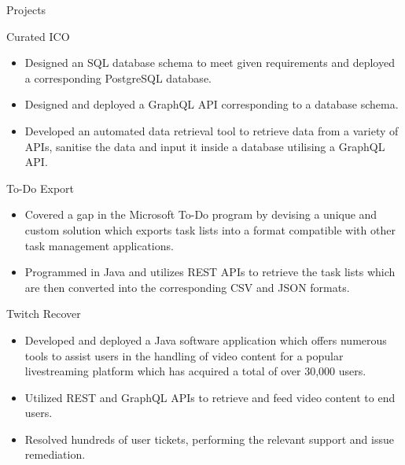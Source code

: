 \documentclass{article}
\newlength{\tabin}
\newlength{\secsep}
\newcommand{\lineunder}{\vspace*{-8pt} \\ \hspace*{-6pt} \hrulefill \\ \vspace*{-15pt}}
\newenvironment{tabbedsection}[1]{
  \begin{list}{}{
      \setlength{\itemsep}{0pt}
      \setlength{\labelsep}{0pt}
      \setlength{\labelwidth}{0pt}
      \setlength{\leftmargin}{\tabin}
      \setlength{\rightmargin}{\tabin}
      \setlength{\listparindent}{0pt}
      \setlength{\parsep}{0pt}
      \setlength{\parskip}{0pt}
      \setlength{\partopsep}{0pt}
      \setlength{\topsep}{#1}
    }
  \item[]
}{\end{list}}
\newenvironment{resume_section}[1]{
  \filbreak
  \vspace{2\secsep}
  \textsc{\large#1}
  \lineunder
  \begin{tabbedsection}{\secsep}
}{\end{tabbedsection}}
\newenvironment{resume_subsection}[2][]{
  \textbf{#2} \hfill {\normalsize #1} \hspace{-5em}
  \begin{tabbedsection}{0.5\secsep}
}{\end{tabbedsection}}
\newenvironment{subitems}{
  \renewcommand{\labelitemi}{-}
  \begin{itemize}
      \setlength{\labelsep}{1em}
}{\end{itemize}}
\begin{document}
\begin{resume_section}{Projects}
	\begin{resume_subsection}{Curated ICO}
		\begin{subitems}
			\item Designed an SQL database schema to meet given requirements and deployed a corresponding PostgreSQL database.
			\item Designed and deployed a GraphQL API corresponding to a database schema.
			\item Developed an automated data retrieval tool to retrieve data from a variety of APIs, sanitise the data and input it inside a database utilising a GraphQL API.
		\end{subitems}
	\end{resume_subsection}
	\vspace{3\secsep}
	\begin{resume_subsection}[(February 2021)]{To-Do Export}
  		\begin{subitems} 
  			\item Covered a gap in the Microsoft To-Do program by devising a unique and custom solution which exports task lists into a format compatible with other task management applications.
  			\item Programmed in Java and utilizes REST APIs to retrieve the task lists which are then converted into the corresponding CSV and JSON formats.
    		\end{subitems}
  	\end{resume_subsection}
  	\vspace{3\secsep}
	\begin{resume_subsection}{Twitch Recover}  
		\begin{subitems}
    			\item Developed and deployed a Java software application which offers numerous tools to assist users in the handling of video content for a popular livestreaming platform which has acquired a total of over 30,000 users.
    			\item Utilized REST and GraphQL APIs to retrieve and feed video content to end users.
    			\item Resolved hundreds of user tickets, performing the relevant support and issue remediation.

\end{subitems}
\end{resume_subsection}
\end{resume_section}
\end{document}
